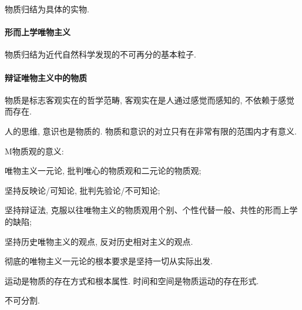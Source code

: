 \documentclass{ctexart}
\begin{document}
物质归结为具体的实物.


\paragraph{形而上学唯物主义} %
\label{par:形而上学唯物主义}

物质归结为近代自然科学发现的不可再分的基本粒子.


\paragraph{辩证唯物主义中的物质} %
\label{par:辩证唯物主义中的物质}

物质是标志客观实在的哲学范畴, 客观实在是人通过感觉而感知的, 不依赖于感觉而存在.
\par
人的思维, 意识也是物质的. 物质和意识的对立只有在非常有限的范围内才有意义.
\par
M物质观的意义:
\begin{cenum}
    \item 唯物主义一元论, 批判唯心的物质观和二元论的物质观;
    \item 坚持反映论/可知论, 批判先验论/不可知论;
    \item 坚持辩证法, 克服以往唯物主义的物质观用个别、个性代替一般、共性的形而上学的缺陷;
    \item 坚持历史唯物主义的观点, 反对历史相对主义的观点.
\end{cenum}
\begin{sample}
    \begin{ex}
        彻底的唯物主义一元论的根本要求是{\color{red}坚持一切从实际出发}.
    \end{ex}
\end{sample}
\begin{finale}
    运动是物质的存在方式和根本属性. 时间和空间是物质运动的存在形式.
\end{finale}
不可分割.
\end{document}
